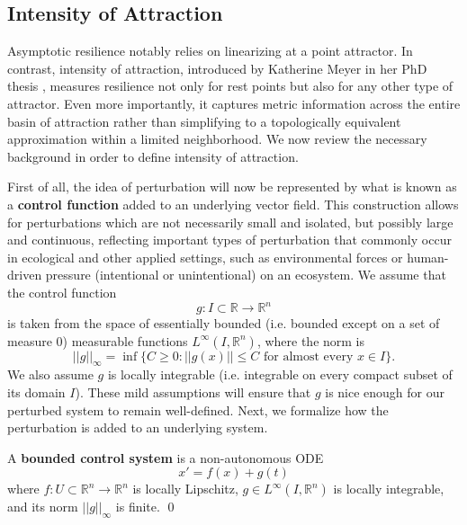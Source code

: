 \subsection{Intensity of Attraction}

Asymptotic resilience notably relies on linearizing at a point attractor. In contrast, intensity of attraction, introduced by Katherine Meyer in her PhD thesis \cite{meyerMetricPropertiesAttractors2019}, measures resilience not only for rest points but also for any other type of attractor. Even more importantly, it captures metric information across the entire basin of attraction rather than simplifying to a topologically equivalent approximation within a limited neighborhood. We now review the necessary background in order to define intensity of attraction. 

First of all, the idea of perturbation will now be represented by what is known as a \textbf{control function} added to an underlying vector field. This construction allows for perturbations which are not necessarily small and isolated, but possibly large and continuous, reflecting important types of perturbation that commonly occur in ecological and other applied settings, such as environmental forces or human-driven pressure (intentional or unintentional) on an ecosystem. We assume that the control function $$g: I \subset \mathbb{R} \to \mathbb{R}^n$$ is taken from the space of essentially bounded (i.e. bounded except on a set of measure 0) measurable functions $L^\infty (I,\mathbb{R}^n)$, where the norm is 
$$||g||_\infty = \inf\{C \geq 0  :  ||g(x)|| \leq C  \text{ for almost every } x \in I \}.$$ 
We also assume $g$ is locally integrable (i.e. integrable on every compact subset of its domain $I$). These mild assumptions will ensure that $g$ is nice enough for our perturbed system to remain well-defined. Next, we formalize how the perturbation is added to an underlying system. 

\begin{definition}
	A \textbf{bounded control system}  is a non-autonomous ODE 
	\begin{equation}
		\label{eqn:control_ode}x' = f(x) + g(t)
	\end{equation}
	where $f: U \subset \mathbb{R}^n \to \mathbb{R}^n$ is locally Lipschitz, $g \in L^\infty (I,\mathbb{R}^n)$ is locally integrable, and its norm $||g||_\infty$ is finite.  \qed
\end{definition}

